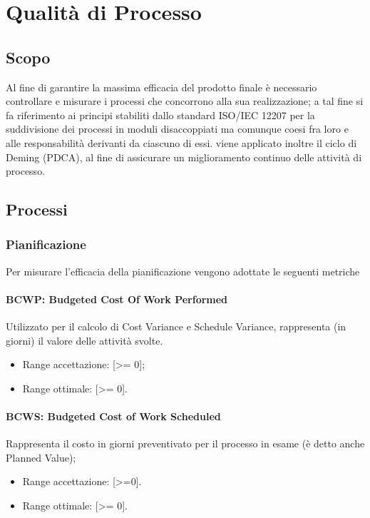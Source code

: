\chapter{Qualità di Processo}
\label{processo} 
\section{Scopo}
Al fine di garantire la massima efficacia del prodotto finale è necessario controllare e misurare i processi che concorrono alla sua realizzazione; a tal fine si fa riferimento ai principi stabiliti dallo standard ISO/IEC 12207 per la suddivisione dei processi in moduli disaccoppiati ma comunque coesi fra loro e alle responsabilità derivanti da ciascuno di essi.
viene applicato inoltre il ciclo di Deming (PDCA), al fine di assicurare un miglioramento continuo delle attività di processo. 

\section{Processi}

\subsection{Pianificazione}
Per misurare l'efficacia della pianificazione vengono adottate le seguenti metriche 

\subsubsection{BCWP: Budgeted Cost Of Work Performed}\label{bcwp}
Utilizzato per il calcolo di Cost Variance e Schedule Variance, rappresenta (in giorni) il valore delle attività svolte.
\begin{itemize}
	\item Range accettazione: [>= 0];
	\item Range ottimale: [>= 0].
\end{itemize}
\subsubsection{BCWS: Budgeted Cost of Work Scheduled}\label{bcws}
Rappresenta il costo in giorni preventivato per il processo in esame (è detto anche Planned Value);
\begin{itemize}
\item Range accettazione: [>=0].
\item Range ottimale: [>= 0].
\end{itemize}

